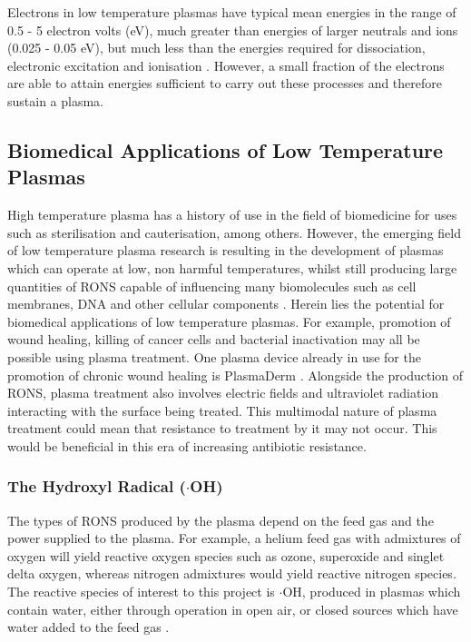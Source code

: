 \documentclass[11pt, oneside]{article}   	%
\begin{document}
Electrons in low temperature plasmas have typical mean energies in the range of 0.5 - 5 electron volts (eV), much greater than energies of larger neutrals and ions (0.025 - 0.05 eV), but much less than the energies required for dissociation, electronic excitation and ionisation \cite{Christophorou2012}.
However, a small fraction of the electrons are able to attain energies sufficient to carry out these processes and therefore sustain a plasma.

\subsection{Biomedical Applications of Low Temperature Plasmas}

High temperature plasma has a history of use in the field of biomedicine for uses such as sterilisation and cauterisation, among others.
However, the emerging field of low temperature plasma research is resulting in the development of plasmas which can operate at low, non harmful temperatures, whilst still producing large quantities of RONS capable of influencing many biomolecules such as cell membranes, DNA and other cellular components \cite{Graves2012}.
Herein lies the potential for biomedical applications of low temperature plasmas.
For example, promotion of wound healing, killing of cancer cells and bacterial inactivation may all be possible using plasma treatment.
One plasma device already in use for the promotion of chronic wound healing is PlasmaDerm \cite{BrehmerHD2015}.
Alongside the production of RONS, plasma treatment also involves electric fields and ultraviolet radiation interacting with the surface being treated.
This multimodal nature of plasma treatment could mean that resistance to treatment by it may not occur. 
This would be beneficial in this era of increasing antibiotic resistance.



\subsubsection{The Hydroxyl Radical ($\cdot$OH)}

The types of RONS produced by the plasma depend on the feed gas and the power supplied to the plasma.
For example, a helium feed gas with admixtures of oxygen will yield reactive oxygen species such as ozone, superoxide and singlet delta oxygen, whereas nitrogen admixtures would yield reactive nitrogen species. 
The reactive species of interest to this project is $\cdot$OH, produced in plasmas which contain water, either through operation in open air, or closed sources which have water added to the feed gas \cite{Schroter2015}.
\end{document}
